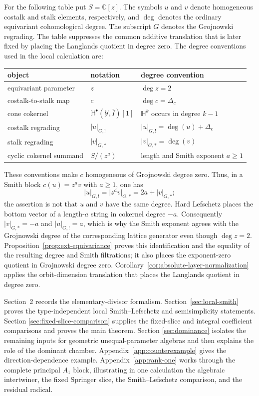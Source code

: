 \documentclass[10pt,a4paper]{amsart}
\begin{document}
For the following table put $S=\mathbb C[z]$.  The symbols $u$ and $v$ denote
homogeneous costalk and stalk elements, respectively, and $\deg$ denotes the
ordinary equivariant cohomological degree.  The subscript $G$ denotes the
Grojnowski regrading.  The table suppresses the common additive
translation that is later fixed by placing the Langlands quotient in degree
zero.  The degree conventions used in the local calculation are:
\begin{center}
\begin{tabular}{@{}lll@{}}
\toprule
object & notation & degree convention\\
\midrule
equivariant parameter & $z$ & $\deg z=2$\\
costalk-to-stalk map & $c$ & $\deg c=\Delta_c$\\
cone cokernel & $\mathbb H^\bullet(\mathcal Y,\overline I)[1]$
  & $\mathbb H^k$ occurs in degree $k-1$\\
costalk regrading & $|u|_{G,!}$ & $|u|_{G,!}=\deg(u)+\Delta_c$\\
stalk regrading & $|v|_{G,*}$ & $|v|_{G,*}=\deg(v)$\\
cyclic cokernel summand & $S/(z^a)$ & length and Smith exponent $a\geq1$\\
\bottomrule
\end{tabular}
\end{center}
These conventions make $c$ homogeneous of Grojnowski degree zero.  Thus, in
a Smith block $c(u)=z^av$ with $a\geq1$, one has
\[
 |u|_{G,!}=|z^av|_{G,*}=2a+|v|_{G,*};
\]
the assertion is not that $u$ and $v$ have the same degree.  Hard Lefschetz
places the bottom vector of a length-$a$ string in cokernel degree $-a$.
Consequently $|v|_{G,*}=-a$ and $|u|_{G,!}=a$, which is why the Smith
exponent agrees with the Grojnowski degree of the corresponding lattice
generator even though $\deg z=2$.  Proposition~\ref{prop:ext-equivariance}
proves this identification and the equality of the resulting degree and
Smith filtrations; it also places the exponent-zero quotient in Grojnowski
degree zero.
Corollary~\ref{cor:absolute-layer-normalization} applies the orbit-dimension
translation that places the Langlands quotient in degree zero.

Section~2 records the elementary-divisor formalism.
Section~\ref{sec:local-smith} proves the type-independent local
Smith--Lefschetz and semisimplicity statements.  Section
\ref{sec:fixed-slice-comparison} supplies the fixed-slice and integral
coefficient comparisons and proves the main theorem.  Section
\ref{sec:dominance} isolates the remaining inputs for geometric
unequal-parameter algebras and then explains the role of the dominant
chamber.  Appendix~\ref{app:counterexample} gives the direction-dependence
example.  Appendix~\ref{app:rank-one} works through the complete principal
$A_1$ block, illustrating in one calculation the algebraic intertwiner, the
fixed Springer slice, the Smith--Lefschetz comparison, and the residual
radical.
\end{document}
